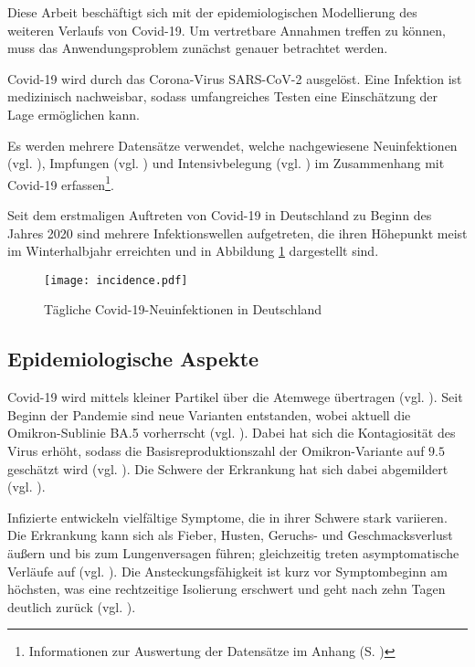 \documentclass[../main.tex]{subfiles}
\begin{document}
    Diese Arbeit beschäftigt sich mit der epidemiologischen Modellierung des weiteren Verlaufs von Covid-19. Um vertretbare Annahmen treffen zu können, muss das Anwendungsproblem zunächst genauer betrachtet werden.

    Covid-19 wird durch das Corona-Virus SARS-CoV-2 ausgelöst. Eine Infektion ist medizinisch nachweisbar, sodass umfangreiches Testen eine Einschätzung der Lage ermöglichen kann.
    
    Es werden mehrere Datensätze verwendet, welche nachgewiesene Neuinfektionen (vgl. \cite{Hei22}), Impfungen (vgl. \cite{BMG22}) und Intensivbelegung (vgl. \cite{DIVI22}) im Zusammenhang mit Covid-19 erfassen\footnote{Informationen zur Auswertung der Datensätze im Anhang (S. \pageref{ap:evaluation})}.

    Seit dem erstmaligen Auftreten von Covid-19 in Deutschland zu Beginn des Jahres 2020 sind mehrere Infektionswellen aufgetreten, die ihren Höhepunkt meist im Winterhalbjahr erreichten und in Abbildung \ref{fig:covid19_incidence} dargestellt sind.

    \begin{figure}[b]
        \texttt{[image: incidence.pdf]}
        \caption{Tägliche Covid-19-Neuinfektionen in Deutschland}
        \label{fig:covid19_incidence}
    \end{figure}

    \subsection{Epidemiologische Aspekte}
    \label{ssec:epidemiological_aspects}
    Covid-19 wird mittels kleiner Partikel über die Atemwege übertragen (vgl. \cite[Übertragungswege]{RKI21}). Seit Beginn der Pandemie sind neue Varianten entstanden, wobei aktuell die Omikron-Sublinie BA.5 vorherrscht (vgl. \cite[Omikron (B.1.1.529)]{RKI22}). Dabei hat sich die Kontagiosität des Virus erhöht, sodass die Basisreproduktionszahl der Omikron-Variante auf $9.5$ geschätzt wird (vgl. \cite[S. 4]{RL22}). Die Schwere der Erkrankung hat sich dabei abgemildert (vgl. \cite[Klinische Manifestation und Krankheitsschwere]{RKI22}).

    Infizierte entwickeln vielfältige Symptome, die in ihrer Schwere stark variieren. Die Erkrankung kann sich als Fieber, Husten, Geruchs- und Geschmacksverlust äußern und bis zum Lungenversagen führen; gleichzeitig treten asymptomatische Verläufe auf (vgl. \cite[Demographische Faktoren, Symptome und Krankheitsverlauf]{RKI21}).
    Die Ansteckungsfähigkeit ist kurz vor Symptombeginn am höchsten, was eine rechtzeitige Isolierung erschwert und geht nach zehn Tagen deutlich zurück (vgl. \cite[Dauer der Ansteckungsfähigkeit]{RKI21}).
\end{document}
